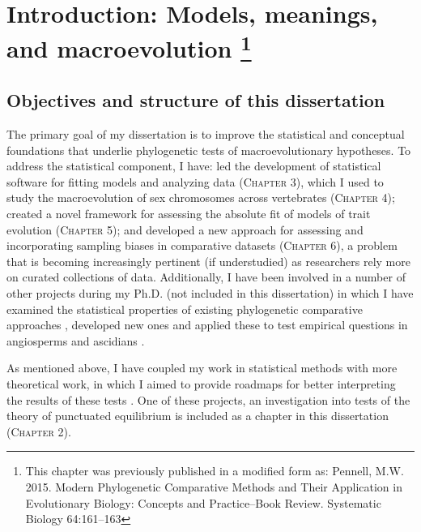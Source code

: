 \chapter[Introduction: Models, meanings, and macroevolution]{Introduction: Models, meanings, and macroevolution \footnote {This chapter was previously published in a modified form as: Pennell, M.W. 2015. Modern Phylogenetic Comparative Methods and Their Application in Evolutionary Biology: Concepts and Practice--Book Review. Systematic Biology 64:161--163}}
\label{chap:introduction}

\section{Objectives and structure of this dissertation}

The primary goal of my dissertation is to improve the statistical and conceptual foundations that underlie phylogenetic tests of macroevolutionary hypotheses. To address the statistical component, I have: led the development of statistical software for fitting models and analyzing data (\textsc{Chapter 3}), which I used to study the macroevolution of sex chromosomes across vertebrates (\textsc{Chapter 4}); created a novel framework for assessing the  absolute fit of models of trait evolution (\textsc{Chapter 5}); and developed a new approach for assessing and incorporating sampling biases in comparative datasets (\textsc{Chapter 6}), a problem that is becoming increasingly pertinent (if understudied) as researchers rely more on curated collections of data. Additionally, I have been involved in a number of other projects during my Ph.D. (not included in this dissertation) in which I have examined the statistical properties of existing phylogenetic comparative approaches \citep{Pennell2012, UyedaPCA, Sarverprior}, developed new ones \citep{SlaterPennell, ksi} and applied these to test empirical questions in angiosperms \citep{ksi, nestedradiations} and ascidians \citep{Maliska2013}.

As mentioned above, I have coupled my work in statistical methods with more theoretical work, in which I aimed to provide roadmaps for better interpreting the results of these tests \citep{Rosenblum2012, PennellHarmon, PennellPE, PennellTREEresponse, Pennellpcmbook}. One of these projects, an investigation into tests of the theory of punctuated equilibrium \citep{Eldredge1971, EldredgeGould1972, GouldEldredge1977} is included as a chapter in this dissertation (\textsc{Chapter 2}). 

